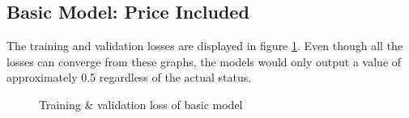 \documentclass[12pt,twoside]{report}
\begin{document}
\subsection{Basic Model: Price Included}
\label{basic_status_training_included}
The training and validation losses are displayed in figure \ref{basic_status}. Even though all the losses can converge from these graphs, the models would only output a value of approximately 0.5 regardless of the actual status.
\\

\begin{figure}[!htbp]
	\centering
	\hfill
	\hfill
	\hfil
	\hfil
	\caption{Training \& validation loss of basic model}
	\label{basic_status}
\end{figure}
\end{document}
